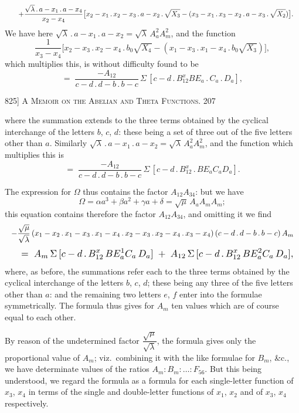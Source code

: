 \documentclass[11pt]{article}
\begin{document}
\[
\resizebox{\textwidth}{!}{$\displaystyle
\quad +\frac{\sqrt{\lambda}\,.\,a-x_{1}\,.\,a-x_{4}}{x_{2}-x_{4}}\bigl[x_{2}-x_{1}\,.\,x_{2}-x_{3}\,.\,a-x_{2}\,.\,\sqrt{X_{3}}-(x_{3}-x_{1}\,.\,x_{3}-x_{2}\,.\,a-x_{3}\,.\,\sqrt{X_{2}})\bigr].
$}
\]
We have here $\sqrt{\lambda}\,.\,a-x_{1}\,.\,a-x_{2}=\sqrt{\lambda}\,A_{a}^{2}A_{m}^{2}$, and the function
\[
\frac{1}{x_{3}-x_{4}}\bigl[x_{2}-x_{3}\,.\,x_{2}-x_{4}\,.\,b_{0}\sqrt{X_{4}}-(x_{1}-x_{3}\,.\,x_{1}-x_{4}\,.\,b_{0}\sqrt{X_{3}})\bigr],
\]
which multiplies this, is without difficulty found to be
\[
=\;\frac{-A_{12}}{c-d\,.\,d-b\,.\,b-c}\,\Sigma\,[c-d\,.\,B_{12}^{x}BE_{a}\,.\,C_{a}\,.\,D_{a}],
\]

\newpage
\noindent\textsc{825] \hfill A Memoir on the Abelian and Theta Functions. \hfill 207}
\vspace{0.6em}

\noindent
where the summation extends to the three terms obtained by the cyclical interchange
of the letters $b$, $c$, $d$: these being a set of three out of the five letters other than $a$.
Similarly $\sqrt{\lambda}\,.\,a-x_{1}\,.\,a-x_{2}=\sqrt{\lambda}\,A_{a}^{2}A_{m}^{2}$, and the function which multiplies this is
\[
=\;\frac{-A_{12}}{c-d\,.\,d-b\,.\,b-c}\,\Sigma\,[c-d\,.\,B_{12}^{x}\,.\,BE_{a}C_{a}D_{a}].
\]

The expression for $\Omega$ thus contains the factor $A_{12}A_{34}$: but we have
\[
\Omega = \alpha a^{3}+\beta a^{2}+\gamma a+\delta = \sqrt{\mu}\,A_{a}A_{m}A_{m};
\]
this equation contains therefore the factor $A_{12}A_{34}$, and omitting it we find
\[
\resizebox{\textwidth}{!}{$\displaystyle
-\frac{\sqrt{\mu}}{\sqrt{\lambda}}\,(x_{1}-x_{2}\,.\,x_{1}-x_{3}\,.\,x_{1}-x_{4}\,.\,x_{2}-x_{3}\,.\,x_{2}-x_{4}\,.\,x_{3}-x_{4})\,(c-d\,.\,d-b\,.\,b-c)\,A_{m}
$}
\]
\[
\resizebox{\textwidth}{!}{$\displaystyle
\quad =\;A_{m}\,\Sigma\,[c-d\,.\,B_{12}^{x}\,BE_{a}^{1}C_{a}\,D_{a}]\;+\;A_{12}\,\Sigma\,[c-d\,.\,B_{12}^{x}\,BE_{a}^{2}C_{a}\,D_{a}],
$}
\]
where, as before, the summations refer each to the three terms obtained by the
cyclical interchange of the letters $b$, $c$, $d$; these being any three of the five letters
other than $a$: and the remaining two letters $e$, $f$ enter into the formulae symmetrically.
The formula thus gives for $A_{m}$ ten values which are of course equal to each other.

By reason of the undetermined factor $\dfrac{\sqrt{\mu}}{\sqrt{\lambda}}$, the formula gives only the proportional
value of $A_{m}$; viz.\ combining it with the like formulae for $B_{m}$, \&c., we have determinate
values of the ratios $A_{m}:B_{m}:\ldots:F_{56}$. But this being understood, we regard the
formula as a formula for each single-letter function of $x_{3}$, $x_{4}$ in terms of the single
and double-letter functions of $x_{1}$, $x_{2}$ and of $x_{3}$, $x_{4}$ respectively.
\end{document}
